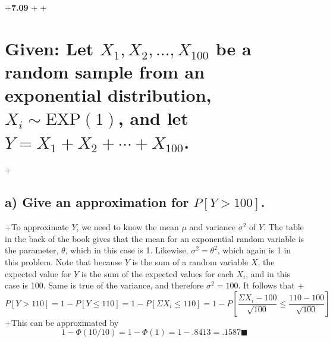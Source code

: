 +{\bf 7.09}
+
+\section*{Given: Let $X_1, X_2, \ldots, X_100$ be a random sample from an exponential distribution, $X_i \sim \text{EXP}(1)$, and let $Y = X_1 + X_2 + \cdots + X_100$.}
+\subsection*{a) Give an approximation for $P[Y > 100]$.}
+To approximate $Y$, we need to know the mean $\mu$ and variance $\sigma^2$ of $Y$. The table in the back of the book gives that the mean for an exponential random variable is the parameter, $\theta$, which in this case is 1. Likewise, $\sigma^2 = \theta^2$, which again is 1 in this problem. Note that because $Y$ is the sum of a random variable $X$, the expected value for $Y$ is the sum of the expected values for each $X_i$, and in this case is 100. Same is true of the variance, and therefore $\sigma^2 = 100$. It follows that 
+$$P[Y > 110] = 1 - P[Y \leq 110] = 1 - P[\Sigma X_i \leq 110] = 1 - P[\frac{\Sigma X_i - 100}{\sqrt{100}} \leq \frac{110 - 100}{\sqrt{100}}]$$
+This can be approximated by $$1 - \Phi (10/10) = 1 - \Phi(1) = 1 - .8413 = .1587 \blacksquare$$
